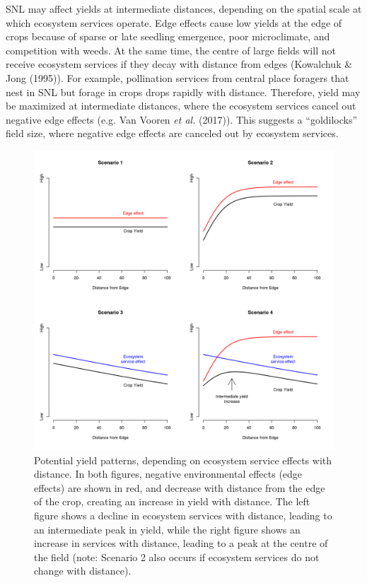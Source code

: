 \documentclass[]{elsarticle} %
\begin{document}
SNL may affect yields at intermediate distances, depending on the spatial scale at which ecosystem services operate.
Edge effects cause low yields at the edge of crops because of sparse or late seedling emergence, poor microclimate, and competition with weeds.
At the same time, the centre of large fields will not receive ecosystem services if they decay with distance from edges (Kowalchuk \& Jong (1995)).
For example, pollination services from central place foragers that nest in SNL but forage in crops drops rapidly with distance.
Therefore, yield may be maximized at intermediate distances, where the ecosystem services cancel out negative edge effects (e.g. Van Vooren \emph{et al.} (2017)).
This suggests a ``goldilocks'' field size, where negative edge effects are canceled out by ecosystem services.

\begin{figure}
\includegraphics[width=1\linewidth]{../Figures/ExamplePlots/hypotheses} \caption{Potential yield patterns, depending on ecosystem service effects with distance. In both figures, negative environmental effects (edge effects) are shown in red, and decrease with distance from the edge of the crop, creating an increase in yield with distance. The left figure shows a decline in ecosystem services with distance, leading to an intermediate peak in yield, while the right figure shows an increase in services with distance, leading to a peak at the centre of the field (note: Scenario 2 also occurs if ecosystem services do not change with distance).}\label{fig:hypotheses}
\end{figure}
\end{document}
